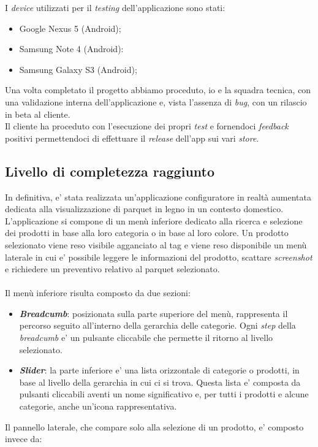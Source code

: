 I \textit{device} utilizzati per il \textit{testing} dell'applicazione sono stati:

\begin{itemize}
	\item Google Nexus 5 (Android);
	\item Samsung Note 4 (Android):
	\item Samsung Galaxy S3 (Android);
\end{itemize}

Una volta completato il progetto abbiamo proceduto, io e la squadra tecnica, con una validazione interna dell'applicazione e, vista l'assenza di \textit{bug}, con un rilascio in beta al cliente.\\
Il cliente ha proceduto con l'esecuzione dei propri \textit{test} e fornendoci \textit{feedback} positivi permettendoci di effettuare il \textit{release} dell'app sui vari \textit{store}.\\

\subsection{Livello di completezza raggiunto}
In definitiva, e' stata realizzata un'applicazione configuratore in realt\`a aumentata dedicata alla visualizzazione di parquet in legno in un contesto domestico. L'applicazione si compone di un men\`u inferiore dedicato alla ricerca e selezione dei prodotti in base alla loro categoria o in base al loro colore. Un prodotto selezionato viene reso visibile agganciato al tag e viene reso disponibile un men\`u laterale in cui e' possibile leggere le informazioni del prodotto, scattare \textit{screenshot} e richiedere un preventivo relativo al parquet selezionato.\\\\
\noindent
Il men\`u inferiore risulta composto da due sezioni:

\begin{itemize}
	\item \textbf{\textit{Breadcumb}}: posizionata sulla parte superiore del men\`u, rappresenta il percorso seguito all'interno della gerarchia delle categorie. Ogni \textit{step} della \textit{breadcumb} e' un pulsante cliccabile che permette il ritorno al livello selezionato.
	\item \textbf{\textit{Slider}}: la parte inferiore e' una lista orizzontale di categorie o prodotti, in base al livello della gerarchia in cui ci si trova. Questa lista e' composta da pulsanti cliccabili aventi un nome significativo e, per tutti i prodotti e alcune categorie, anche un'icona rappresentativa.
\end{itemize}
\noindent
Il pannello laterale, che compare solo alla selezione di un prodotto, e' composto invece da:

